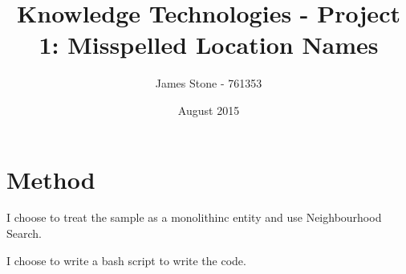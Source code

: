 \documentclass[a4paper]{article}
\title{Knowledge Technologies - Project 1: Misspelled Location Names}
\author{James Stone - 761353}}
\date{August 2015}
\begin{document}
\maketitle

\begin{abstract}
\end{abstract}

\section{Method}
I choose to treat the sample as a monolithinc entity and use Neighbourhood Search.

I choose to write a bash script to write the code.
\end{document}
